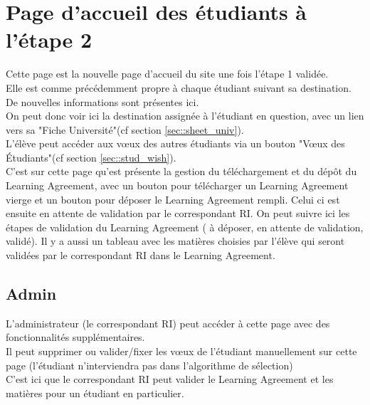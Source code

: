 \section{Page d'accueil des étudiants à l'étape 2}

Cette page est la nouvelle page d'accueil du site une fois l'étape 1 validée.\\
Elle est comme précédemment propre à chaque étudiant suivant sa destination. De nouvelles informations sont présentes ici.\\
On peut donc voir ici la destination assignée à l'étudiant en question, avec un lien vers sa "Fiche Université"(cf section \ref{sec::sheet_univ}).\\
L'élève peut accéder aux vœux des autres étudiants via un bouton "Vœux des Étudiants"(cf section \ref{sec::stud_wish}).\\
C'est sur cette page qu'est présente la gestion du téléchargement et du dépôt du Learning Agreement, avec un bouton pour télécharger un Learning Agreement vierge et un bouton pour déposer le Learning Agreement rempli.
Celui ci est ensuite en attente de validation par le correspondant RI. On peut suivre ici les étapes de validation du Learning Agreement ( à déposer, en attente de validation, validé).
\bigbreak
Il y a aussi un tableau avec les matières choisies par l'élève qui seront validées par le correspondant RI dans le Learning Agreement.\\

\subsection{Admin}

L'administrateur (le correspondant RI) peut accéder à cette page avec des fonctionnalités supplémentaires.\\
Il peut supprimer ou valider/fixer les vœux de l'étudiant manuellement sur cette page (l'étudiant n'interviendra pas dans l'algorithme de sélection)\\
C'est ici que le correspondant RI peut valider le Learning Agreement et les matières pour un étudiant en particulier.\\
